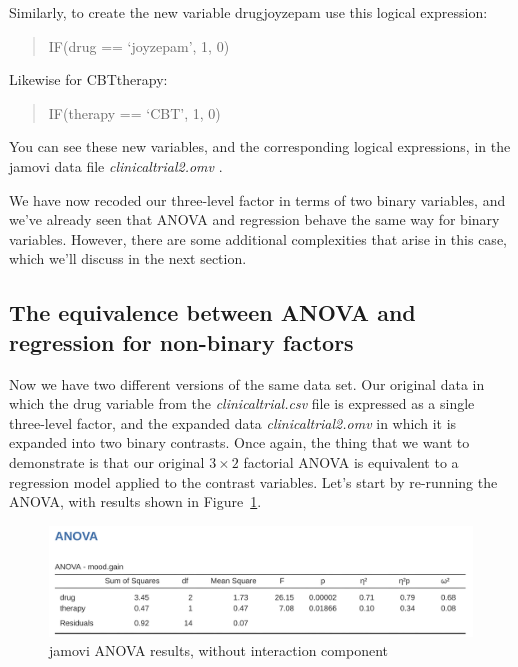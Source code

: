 \documentclass[
  a4paper,
]{book}
\begin{document}
Similarly, to create the new variable drugjoyzepam use this logical
expression:

\begin{quote}
IF(drug == `joyzepam', 1, 0)
\end{quote}

Likewise for CBTtherapy:

\begin{quote}
IF(therapy == `CBT', 1, 0)
\end{quote}

You can see these new variables, and the corresponding logical
expressions, in the jamovi data file \emph{clinicaltrial2.omv} .

We have now recoded our three-level factor in terms of two binary
variables, and we've already seen that ANOVA and regression behave the
same way for binary variables. However, there are some additional
complexities that arise in this case, which we'll discuss in the next
section.

\hypertarget{the-equivalence-between-anova-and-regression-for-non-binary-factors}{%
\subsection{The equivalence between ANOVA and regression for non-binary
factors}\label{the-equivalence-between-anova-and-regression-for-non-binary-factors}}

Now we have two different versions of the same data set. Our original
data in which the drug variable from the \emph{clinicaltrial.csv} file
is expressed as a single three-level factor, and the expanded data
\emph{clinicaltrial2.omv} in which it is expanded into two binary
contrasts. Once again, the thing that we want to demonstrate is that our
original \(3 \times 2\) factorial ANOVA is equivalent to a regression
model applied to the contrast variables. Let's start by re-running the
ANOVA, with results shown in Figure~\ref{fig-fig14-20}.

\begin{figure}

\includegraphics[width=1\textwidth,height=\textheight]{images/fig14-20.png} \hfill{}

\caption{\label{fig-fig14-20}jamovi ANOVA results, without interaction
component}

\end{figure}
\end{document}
